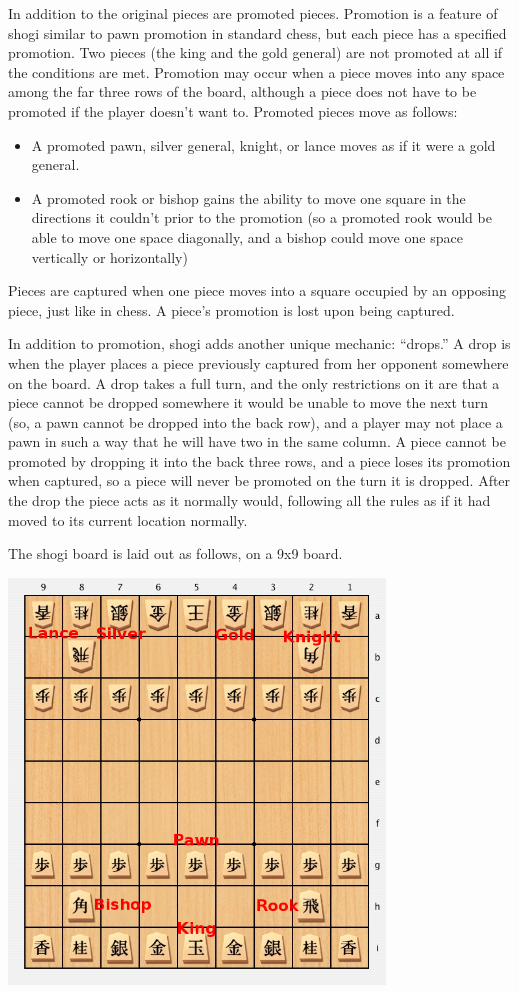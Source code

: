\documentclass[letterpaper,12pt]{article}
\begin{document}
 In addition to the original pieces are promoted pieces. Promotion is a feature of shogi similar to pawn promotion in standard chess, but each piece has a specified promotion. Two pieces (the king and the gold general) are not promoted at all if the conditions are met. Promotion may occur when a piece moves into any space among the far three rows of the board, although a piece does not have to be promoted if the player doesn’t want to. Promoted pieces move as follows:
  \begin{itemize}
  \item A promoted pawn, silver general, knight, or lance moves as if it were a gold general.
  \item A promoted rook or bishop gains the ability to move one square in the directions it couldn’t prior to the promotion (so a promoted rook would be able to move one space diagonally, and a bishop could move one space vertically or horizontally)
  \end{itemize}

Pieces are captured when one piece moves into a square occupied by an opposing piece, just like in chess. A piece’s promotion is lost upon being captured.

In addition to promotion, shogi adds another unique mechanic: “drops.” A drop is when the player places a piece previously captured from her opponent somewhere on the board. A drop takes a full turn, and the only restrictions on it are that a piece cannot be dropped somewhere it would be unable to move the next turn (so, a pawn cannot be dropped into the back row), and a player may not place a pawn in such a way that he will have two in the same column. A piece cannot be promoted by dropping it into the back three rows, and a piece loses its promotion when captured, so a piece will never be promoted on the turn it is dropped. After the drop the piece acts as it normally would, following all the rules as if it had moved to its current location normally.

The shogi board is laid out as follows, on a 9x9 board.

\begin{center}
 \includegraphics[width=10cm]{img/shogiBoard.png}
\end{center}
\end{document}
